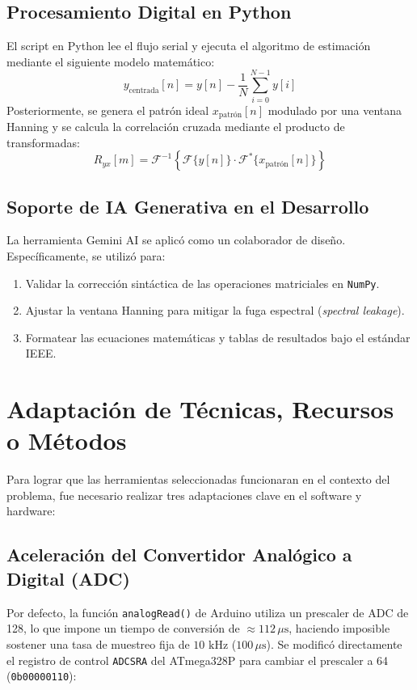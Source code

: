 \documentclass[conference]{IEEEtran}
\begin{document}
\subsection{Procesamiento Digital en Python}
El script en Python lee el flujo serial y ejecuta el algoritmo de estimación mediante el siguiente modelo matemático:
\begin{equation}
y_{\text{centrada}}[n] = y[n] - \frac{1}{N} \sum_{i=0}^{N-1} y[i]
\end{equation}
Posteriormente, se genera el patrón ideal $x_{\text{patrón}}[n]$ modulado por una ventana Hanning y se calcula la correlación cruzada mediante el producto de transformadas:
\begin{equation}
R_{yx}[m] = \mathcal{F}^{-1} \left\{ \mathcal{F}\{y[n]\} \cdot \mathcal{F}^*\{x_{\text{patrón}}[n]\} \right\}
\end{equation}

\subsection{Soporte de IA Generativa en el Desarrollo}
La herramienta Gemini AI se aplicó como un colaborador de diseño. Específicamente, se utilizó para:
\begin{enumerate}
    \item Validar la corrección sintáctica de las operaciones matriciales en \texttt{NumPy}.
    \item Ajustar la ventana Hanning para mitigar la fuga espectral (\textit{spectral leakage}).
    \item Formatear las ecuaciones matemáticas y tablas de resultados bajo el estándar IEEE.
\end{enumerate}

\section{Adaptación de Técnicas, Recursos o Métodos}
Para lograr que las herramientas seleccionadas funcionaran en el contexto del problema, fue necesario realizar tres adaptaciones clave en el software y hardware:

\subsection{Aceleración del Convertidor Analógico a Digital (ADC)}
Por defecto, la función \texttt{analogRead()} de Arduino utiliza un prescaler de ADC de 128, lo que impone un tiempo de conversión de $\approx 112\,\mu\text{s}$, haciendo imposible sostener una tasa de muestreo fija de $10\text{ kHz}$ ($100\,\mu\text{s}$). Se modificó directamente el registro de control \texttt{ADCSRA} del ATmega328P para cambiar el prescaler a 64 (\texttt{0b00000110}):
\end{document}
